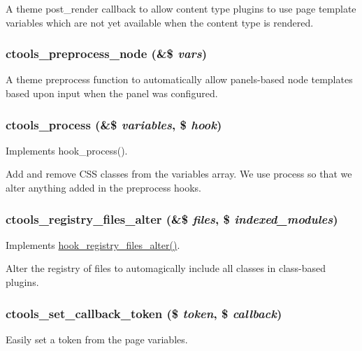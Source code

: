 \label{ctools_8module_ada3893e7993e19022048e2b47b413baa}
A theme post\_\-render callback to allow content type plugins to use page template variables which are not yet available when the content type is rendered. \hypertarget{ctools_8module_aacda26406250e7a22dbfce3c95e8a364}{
\subsubsection[{ctools\_\-preprocess\_\-node}]{\setlength{\rightskip}{0pt plus 5cm}ctools\_\-preprocess\_\-node (\&\$ {\em vars})}}
\label{ctools_8module_aacda26406250e7a22dbfce3c95e8a364}
A theme preprocess function to automatically allow panels-\/based node templates based upon input when the panel was configured. \hypertarget{ctools_8module_a2f9ba929f2bd627113c551823ac43afc}{
\subsubsection[{ctools\_\-process}]{\setlength{\rightskip}{0pt plus 5cm}ctools\_\-process (\&\$ {\em variables}, \/  \$ {\em hook})}}
\label{ctools_8module_a2f9ba929f2bd627113c551823ac43afc}
Implements hook\_\-process().

Add and remove CSS classes from the variables array. We use process so that we alter anything added in the preprocess hooks. \hypertarget{ctools_8module_ae64a38f412c2d9b9892b29551c27f104}{
\subsubsection[{ctools\_\-registry\_\-files\_\-alter}]{\setlength{\rightskip}{0pt plus 5cm}ctools\_\-registry\_\-files\_\-alter (\&\$ {\em files}, \/  \$ {\em indexed\_\-modules})}}
\label{ctools_8module_ae64a38f412c2d9b9892b29551c27f104}
Implements \hyperlink{group__hooks_ga5b1201bb1afca26333900cd9aca6a2de}{hook\_\-registry\_\-files\_\-alter()}.

Alter the registry of files to automagically include all classes in class-\/based plugins. \hypertarget{ctools_8module_a75a083090c8f72d76a9e6378a911bc50}{
\subsubsection[{ctools\_\-set\_\-callback\_\-token}]{\setlength{\rightskip}{0pt plus 5cm}ctools\_\-set\_\-callback\_\-token (\$ {\em token}, \/  \$ {\em callback})}}
\label{ctools_8module_a75a083090c8f72d76a9e6378a911bc50}
Easily set a token from the page variables.

